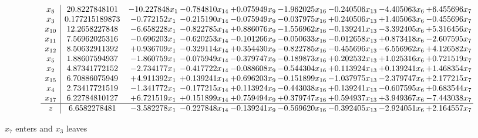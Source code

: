\documentclass[10pt]{article}
\begin{document}
 \[\begin{array}{c| c c@{\hskip 2pt} c@{\hskip 2pt} c@{\hskip 2pt} c@{\hskip 2pt} c@{\hskip 2pt} c@{\hskip 2pt} c@{\hskip 2pt} }
 x_{8}   &  20.8227848101 & -10.227848 x_{1} & -0.784810 x_{14} & + 0.075949 x_{9} & -1.962025 x_{16} & -0.240506 x_{13} & -4.405063 x_{6} & + 6.455696 x_{7}\\
 x_{3}   &  0.177215189873 & -0.772152 x_{1} & -0.215190 x_{14} & -0.075949 x_{9} & -0.037975 x_{16} & + 0.240506 x_{13} & + 1.405063 x_{6} & -0.455696 x_{7}\\
 x_{10}   &  12.2658227848 & -6.658228 x_{1} & -0.822785 x_{14} & + 0.886076 x_{9} & -1.556962 x_{16} & -0.139241 x_{13} & -3.392405 x_{6} & + 5.316456 x_{7}\\
 x_{11}   &  7.56962025316 & -0.696203 x_{1} & -0.620253 x_{14} & -0.101266 x_{9} & -0.050633 x_{16} & -0.012658 x_{13} & + 0.873418 x_{6} & -2.607595 x_{7}\\
 x_{12}   &  8.50632911392 & + 0.936709 x_{1} & -0.329114 x_{14} & + 0.354430 x_{9} & -0.822785 x_{16} & -0.455696 x_{13} & -6.556962 x_{6} & + 4.126582 x_{7}\\
 x_{5}   &  1.88607594937 & -1.860759 x_{1} & -0.075949 x_{14} & -0.379747 x_{9} & -0.189873 x_{16} & + 0.202532 x_{13} & + 1.025316 x_{6} & + 0.721519 x_{7}\\
 x_{2}   &  4.87341772152 & -2.734177 x_{1} & -0.417722 x_{14} & -0.088608 x_{9} & -0.544304 x_{16} & + 0.113924 x_{13} & + 0.139241 x_{6} & + 1.468354 x_{7}\\
 x_{15}   &  6.70886075949 & + 4.911392 x_{1} & + 0.139241 x_{14} & + 0.696203 x_{9} & -0.151899 x_{16} & -1.037975 x_{13} & -2.379747 x_{6} & + 2.177215 x_{7}\\
 x_{4}   &  2.73417721519 & -1.341772 x_{1} & -0.177215 x_{14} & + 0.113924 x_{9} & -0.443038 x_{16} & + 0.139241 x_{13} & -0.607595 x_{6} & + 0.683544 x_{7}\\
 x_{17}   &  6.22784810127 & + 6.721519 x_{1} & + 0.151899 x_{14} & + 0.759494 x_{9} & + 0.379747 x_{16} & + 0.594937 x_{13} & + 3.949367 x_{6} & -7.443038 x_{7}\\
\hline
z    &  6.6582278481 & -3.582278 x_{1} & -0.227848 x_{14} & -0.139241 x_{9} & -0.569620 x_{16} & -0.392405 x_{13} & -2.924051 x_{6} & + 2.164557 x_{7}\\
\end{array}\]


 $ x_{7} $ enters and $ x_{3} $ leaves 
\end{document}
